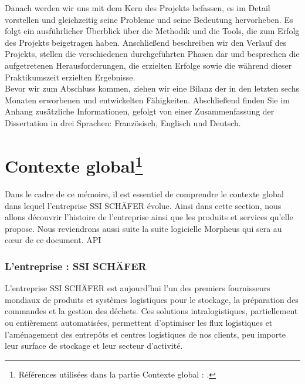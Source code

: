 \documentclass[a4paper, 12pt, french]{article}
\begin{document}
		Danach werden wir uns mit dem Kern des Projekts befassen, es  im Detail vorstellen und gleichzeitig seine Probleme und seine Bedeutung  hervorheben. Es folgt ein ausführlicher Überblick über die Methodik und die Tools, die zum Erfolg des Projekts beigetragen haben. Anschließend beschreiben wir den Verlauf des Projekts, stellen die verschiedenen durchgeführten Phasen dar und besprechen die aufgetretenen Herausforderungen, die erzielten Erfolge sowie die während dieser Praktikumszeit erzielten Ergebnisse.\\

		Bevor wir zum Abschluss kommen, ziehen wir eine Bilanz der in den letzten sechs Monaten erworbenen und entwickelten Fähigkeiten. Abschließend finden Sie im Anhang zusätzliche Informationen, gefolgt von einer Zusammenfassung der Dissertation in drei Sprachen: Französisch, Englisch und Deutsch.

	\newpage

	
		
		\part{Contexte global\footnote{Références utilisées dans la partie \ref{section:context} Contexte global : \cite{schaefer}\space\cite{schaeferHistory}\space\cite{schaeferFR}\space\cite{schaeferMorpheus}\space.}}\label{section:context}
		Dans le cadre de ce mémoire, il est essentiel de comprendre le contexte global dans lequel l'entreprise SSI SCHÄFER évolue. Ainsi dans cette section, nous allons découvrir l'histoire de l'entreprise ainsi que les produits et services qu'elle propose. Nous reviendrons aussi suite la suite logicielle Morpheus qui sera au c\oe ur de ce document. \gls{API}
		
		\section{L'entreprise : SSI SCHÄFER}
			L'entreprise SSI SCHÄFER est aujourd'hui l'un des premiers fournisseurs mondiaux de produits et systèmes logistiques pour le stockage, la préparation des commandes et la gestion des déchets. Ces solutions intralogistiques, partiellement ou entièrement automatisées, permettent d’optimiser les flux logistiques et l’aménagement des entrepôts et centres logistiques de nos clients, peu importe leur surface de stockage et leur secteur d’activité.
\end{document}
